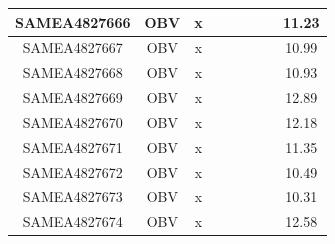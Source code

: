 \documentclass[../main.tex]{subfiles}
\begin{document}
\begin{flushleft}
\begin{footnotesize}
\begin{longtable}{|c|c|c|c|c|c|c|}
    \hline
    SAMEA4827666  & OBV   & x                                                            & ~          & ~                                                                           & ~                                                                 & 11.23     \\ 
    \hline
    SAMEA4827667  & OBV   & x                                                            & ~          & ~                                                                           & ~                                                                 & 10.99     \\ 
    \hline
    SAMEA4827668  & OBV   & x                                                            & ~          & ~                                                                           & ~                                                                 & 10.93     \\ 
    \hline
    SAMEA4827669  & OBV   & x                                                            & ~          & ~                                                                           & ~                                                                 & 12.89     \\ 
    \hline
    SAMEA4827670  & OBV   & x                                                            & ~          & ~                                                                           & ~                                                                 & 12.18     \\ 
    \hline
    SAMEA4827671  & OBV   & x                                                            & ~          & ~                                                                           & ~                                                                 & 11.35     \\ 
    \hline
    SAMEA4827672  & OBV   & x                                                            & ~          & ~                                                                           & ~                                                                 & 10.49     \\ 
    \hline
    SAMEA4827673  & OBV   & x                                                            & ~          & ~                                                                           & ~                                                                 & 10.31     \\ 
    \hline
    SAMEA4827674  & OBV   & x                                                            & ~          & ~                                                                           & ~                                                                 & 12.58     \\ 

\end{longtable}
\end{footnotesize}
\end{flushleft}
\end{document}
